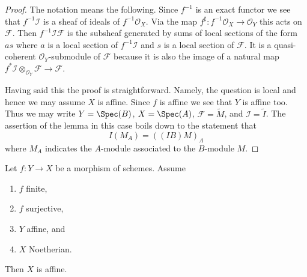 \begin{proof}
The notation means the following. Since $f^{-1}$ is an exact functor
we see that $f^{-1}\mathcal{I}$ is a sheaf
of ideals of $f^{-1}\mathcal{O}_X$. Via the map
$f^\sharp : f^{-1}\mathcal{O}_X \to \mathcal{O}_Y$ this acts on
$\mathcal{F}$. Then $f^{-1}\mathcal{I}\mathcal{F}$ is the subsheaf
generated by sums of local sections of the form $as$ where $a$
is a local section of $f^{-1}\mathcal{I}$ and $s$ is a local section
of $\mathcal{F}$. It is a quasi-coherent $\mathcal{O}_Y$-submodule
of $\mathcal{F}$ because it is also the image of a natural map
$f^*\mathcal{I} \otimes_{\mathcal{O}_Y} \mathcal{F} \to \mathcal{F}$.

\medskip\noindent
Having said this the proof is straightforward. Namely, the question is local
and hence we may assume $X$ is affine. Since $f$ is affine we see that
$Y$ is affine too. Thus we may write
$Y = \Spec(B)$, $X = \Spec(A)$, $\mathcal{F} = \widetilde{M}$,
and $\mathcal{I} = \widetilde{I}$. The assertion of the lemma in this
case boils down to the statement that
$$
I(M_A) = ((IB)M)_A
$$
where $M_A$ indicates the $A$-module associated to the $B$-module $M$.
\end{proof}

\begin{lemma}
\label{lemma-image-affine-finite-morphism-affine-Noetherian}
Let $f : Y \to X$ be a morphism of schemes.
Assume
\begin{enumerate}
\item $f$ finite,
\item $f$ surjective,
\item $Y$ affine, and
\item $X$ Noetherian.
\end{enumerate}
Then $X$ is affine.
\end{lemma}

